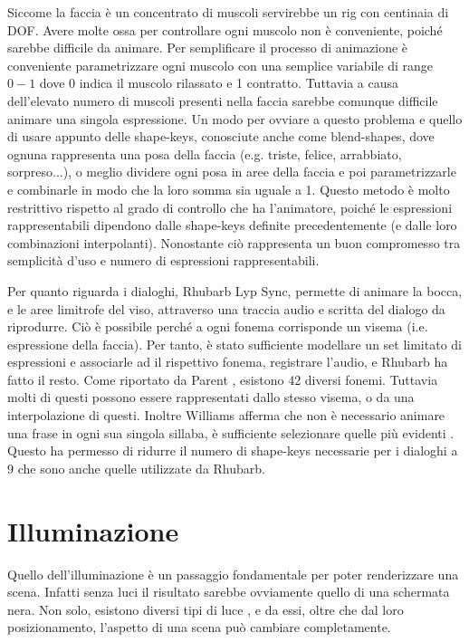 Siccome la faccia è un concentrato di muscoli servirebbe un rig con centinaia di DOF.
Avere molte ossa per controllare ogni muscolo non è conveniente, poiché sarebbe difficile da animare.
Per semplificare il processo di animazione è conveniente parametrizzare ogni muscolo con una semplice variabile di range $0-1$ dove 0 indica il muscolo rilassato e 1 contratto.
Tuttavia a causa dell'elevato numero di muscoli presenti nella faccia sarebbe comunque difficile animare una singola espressione.
Un modo per ovviare a questo problema e quello di usare appunto delle shape-keys, conosciute anche come blend-shapes, dove ognuna rappresenta una posa della faccia (e.g. triste, felice, arrabbiato, sorpreso...), o meglio dividere ogni posa in aree della faccia e poi parametrizzarle e combinarle in modo che la loro somma sia uguale a 1.
Questo metodo è molto restrittivo rispetto al grado di controllo che ha l'animatore, poiché le espressioni rappresentabili dipendono dalle shape-keys definite precedentemente (e dalle loro combinazioni interpolanti).
Nonostante ciò rappresenta un buon compromesso tra semplicità d'uso e numero di espressioni rappresentabili.

Per quanto riguarda i dialoghi, Rhubarb Lyp Sync, permette di animare la bocca, e le aree limitrofe del viso, attraverso una traccia audio e scritta del dialogo da riprodurre.
Ciò è possibile perché a ogni fonema corrisponde un visema (i.e. espressione della faccia).
Per tanto, è stato sufficiente modellare un set limitato di espressioni e associarle ad il rispettivo fonema, registrare l'audio, e Rhubarb ha fatto il resto.
Come riportato da Parent \cite{Parent:2012:CAA:2385444}, esistono 42 diversi fonemi. Tuttavia molti di questi possono essere rappresentati dallo stesso visema, o da una interpolazione di questi.
Inoltre Williams afferma che non è necessario animare una frase in ogni sua singola sillaba, è sufficiente selezionare quelle più evidenti \cite{Williams:2009:ASK:1823185}. Questo ha permesso di ridurre il numero di shape-keys necessarie per i dialoghi a 9 che sono anche quelle utilizzate da Rhubarb.

\section{Illuminazione}

Quello dell'illuminazione è un passaggio fondamentale per poter renderizzare una scena. Infatti senza luci il risultato sarebbe ovviamente quello di una schermata nera.
Non solo, esistono diversi tipi di luce \cite{lightArt}, e da essi, oltre che dal loro posizionamento, l'aspetto di una scena può cambiare completamente.

